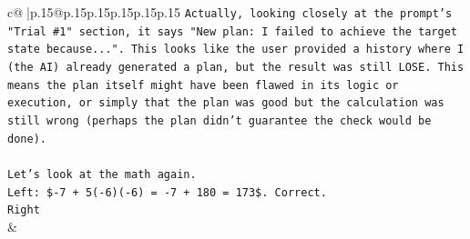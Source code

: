 \documentclass{article}
\begin{document}
{\begin{supertabular}{c@{$\;$}|p{.15\linewidth}@{}p{.15\linewidth}p{.15\linewidth}p{.15\linewidth}p{.15\linewidth}p{.15\linewidth}}
{{{\texttt{Actually, looking closely at the prompt's "Trial \#1" section, it says "New plan: I failed to achieve the target state because...". This looks like the user provided a history where I (the AI) already generated a plan, but the result was still LOSE. This means the plan itself might have been flawed in its logic or execution, or simply that the plan was good but the calculation was still wrong (perhaps the plan didn't guarantee the check would be done).} \\
\\ 
\texttt{Let's look at the math again.} \\
\texttt{Left: \${-}7 + 5({-}6)({-}6) = {-}7 + 180 = 173\$. Correct.} \\
\texttt{Right} \\
            }
        }
    }
    & \\ \\

\end{supertabular}
}
\end{document}
